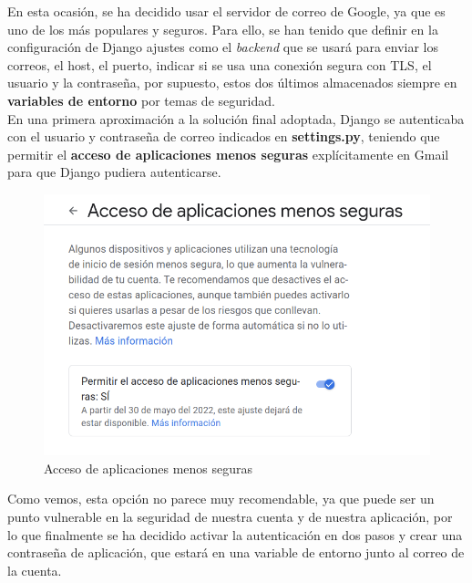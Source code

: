 En esta ocasión, se ha decidido usar el servidor de correo de Google, ya que es uno de los
más populares y seguros. Para ello, se han tenido que definir en la configuración de
Django ajustes como el \textit{backend} que se usará para enviar los correos, el host, el
puerto, indicar si se usa una conexión segura con TLS, el usuario y la contraseña, por
supuesto, estos dos últimos almacenados siempre en \textbf{variables de entorno} por temas
de seguridad.\\

En una primera aproximación a la solución final adoptada, Django se autenticaba con el
usuario y contraseña de correo indicados en \textbf{settings.py}, teniendo que permitir
el \textbf{acceso de aplicaciones menos seguras} explícitamente en Gmail para que Django
pudiera autenticarse.

    \begin{figure}[H]
        \centering
        \includegraphics[scale=0.47]{imagenes/apps-access.png}
        \caption{Acceso de aplicaciones menos seguras}
        \label{fig:apps-access}
    \end{figure}

Como vemos, esta opción no parece muy recomendable, ya que puede ser un punto vulnerable
en la seguridad de nuestra cuenta y de nuestra aplicación, por lo que finalmente se ha
decidido activar la autenticación en dos pasos y crear una contraseña de aplicación,
que estará en una variable de entorno junto al correo de la cuenta.

